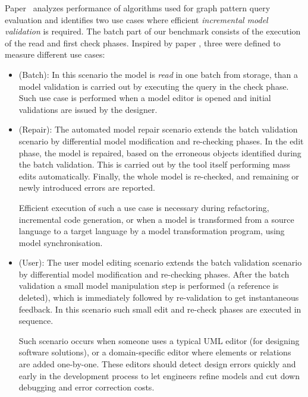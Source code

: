Paper~\cite{icgt08-bhrv} analyzes performance of algorithms used for graph
pattern query evaluation and identifies two use cases where efficient
\emph{incremental model validation} is required. The batch part of our benchmark
consists of the execution of the read and first check phases. Inspired by paper
\cite{icgt08-bhrv}, three  were defined to measure different
use cases:
\begin{itemize}
  
  \item {} (\textsf{Batch}):
  In this scenario the model is \emph{read} in one batch from storage, than a model validation is carried out by executing the query in the check phase. Such use case is performed when a model editor is opened and initial validations are issued by the designer. 
  
  \item {} (\textsf{Repair}):
  The automated model repair scenario extends the batch validation scenario by differential model modification and re-checking phases. In the edit phase, the model is repaired, based on the erroneous objects identified during the batch validation. This is carried out by the tool itself performing mass edits automatically. Finally, the whole model is re-checked, and remaining or newly introduced errors are reported. 
  
  Efficient execution of such a use case is necessary during refactoring, incremental code generation, or when a model is transformed from a source language to a target language by a model transformation program, using model synchronisation.
  
  \item {} (\textsf{User}):
  The user model editing scenario extends the batch validation scenario by differential model modification and re-checking phases. After the batch validation a small model manipulation step is performed (\eg a reference is deleted), which is immediately followed by re-validation to get instantaneous feedback.  In this scenario such small edit and re-check phases are executed in sequence.
  
  Such scenario occurs when someone uses a typical UML editor (for designing software solutions), or a domain-specific editor where elements or relations are added one-by-one. These editors should detect design errors quickly and early in the development process to let engineers refine models and cut down debugging and error correction costs.
  
\end{itemize}


